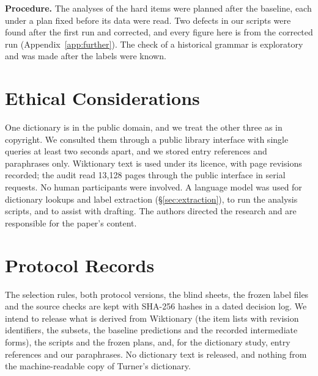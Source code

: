 \documentclass[11pt]{article}
\begin{document}
\textbf{Procedure.} The analyses of the hard items were planned after the baseline, each under a plan fixed before its data were read. Two defects in our scripts were found after the first run and corrected, and every figure here is from the corrected run (Appendix~\ref{app:further}). The check of a historical grammar is exploratory and was made after the labels were known.

\section*{Ethical Considerations}

One dictionary is in the public domain, and we treat the other three as in copyright. We consulted them through a public library interface with single queries at least two seconds apart, and we stored entry references and paraphrases only. Wiktionary text is used under its licence, with page revisions recorded; the audit read 13,128 pages through the public interface in serial requests. No human participants were involved. A language model was used for dictionary lookups and label extraction (\S\ref{sec:extraction}), to run the analysis scripts, and to assist with drafting. The authors directed the research and are responsible for the paper's content.



\appendix

\section{Protocol Records}
\label{app:records}

The selection rules, both protocol versions, the blind sheets, the frozen label files and the source checks are kept with SHA-256 hashes in a dated decision log. We intend to release what is derived from Wiktionary (the item lists with revision identifiers, the subsets, the baseline predictions and the recorded intermediate forms), the scripts and the frozen plans, and, for the dictionary study, entry references and our paraphrases. No dictionary text is released, and nothing from the machine-readable copy of Turner's dictionary.
\end{document}
